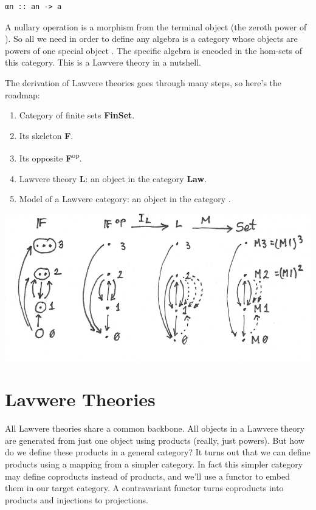 \begin{Verbatim}[commandchars=\\\{\}]
αn :: an -> a
\end{Verbatim}

A nullary operation is a morphism from the terminal object (the zeroth
power of ). So all we need in order to define any algebra is a
category whose objects are powers of one special object . The
specific algebra is encoded in the hom-sets of this category. This is a
Lawvere theory in a nutshell.

The derivation of Lawvere theories goes through many steps, so here's
the roadmap:

\begin{enumerate}
\tightlist
\item
  Category of finite sets \textbf{FinSet}.
\item
  Its skeleton \textbf{F}.
\item
  Its opposite \textbf{F}\textsuperscript{op}.
\item
  Lawvere theory \textbf{L}: an object in the category \textbf{Law}.
\item
  Model  of a Lawvere category: an object in the category
  .
\end{enumerate}

\includegraphics[width=5.31250in]{images/lawvere1.png}

\section{Lavwere Theories}\label{lavwere-theories}

All Lawvere theories share a common backbone. All objects in a Lawvere
theory are generated from just one object using products (really, just
powers). But how do we define these products in a general category? It
turns out that we can define products using a mapping from a simpler
category. In fact this simpler category may define coproducts instead of
products, and we'll use a  functor to embed them in
our target category. A contravariant functor turns coproducts into
products and injections to projections.

